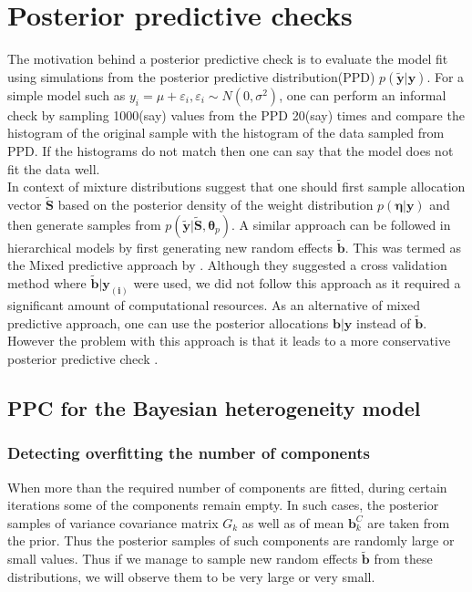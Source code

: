 \section{Posterior predictive checks}
\label{sec : ppc}
The motivation behind a posterior predictive check is to evaluate the model fit using simulations from the posterior predictive distribution(PPD) $p(\boldsymbol{\tilde{y}}|\boldsymbol{y})$. For a simple model such as $y_i = \mu + \varepsilon_i, \varepsilon_i \sim N(0, \sigma^2)$, one can perform an informal check by sampling 1000(say) values from the PPD 20(say) times and compare the histogram of the original sample with the histogram of the data sampled from PPD. If the histograms do not match then one can say that the model does not fit the data well.\\

In context of mixture distributions \citet{fruhwirth-schnatter_finite_2013} suggest that one should first sample allocation vector $\boldsymbol{\tilde{S}}$ based on the posterior density of the weight distribution $p(\boldsymbol{\eta}|\boldsymbol{y})$ and then generate samples from $p(\boldsymbol{\tilde{y}}|\boldsymbol{\tilde{S}}, \boldsymbol{\theta}_p)$. A similar approach can be followed in hierarchical models by first generating new random effects $\boldsymbol{\tilde{b}}$. This was termed as the Mixed predictive approach by \citet{marshall_approximate_2003}. Although they suggested a cross validation method where $\boldsymbol{\tilde{b}}|\boldsymbol{y_{(i)}}$ were used, we did not follow this approach as it required a significant amount of computational resources. As an alternative of mixed predictive approach, one can use the posterior allocations $\boldsymbol{b}|\boldsymbol{y}$ instead of $\boldsymbol{\tilde{b}}$. However the problem with this approach is that it leads to a more conservative posterior predictive check \citep{congdon_applied_2010}.\\

\subsection{PPC for the Bayesian heterogeneity model}
\label{subsec : ppc_bhtge}
\subsubsection{Detecting overfitting the number of components}
When more than the required number of components are fitted, during certain iterations some of the components remain empty. In such cases, the posterior samples of variance covariance matrix $G_k$ as well as of mean $\boldsymbol{b}_k^C$ are taken from the prior. Thus the posterior samples of such components are randomly large or small values. Thus if we manage to sample new random effects $\boldsymbol{\tilde{b}}$ from these distributions, we will observe them to be very large or very small.\\

